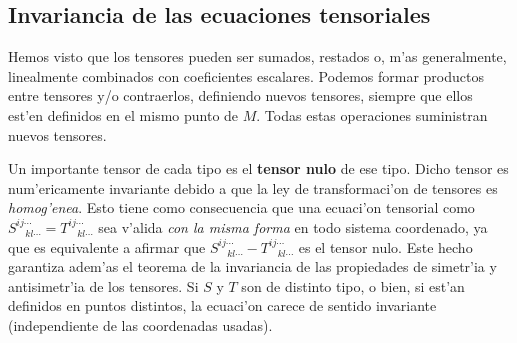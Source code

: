 \subsection{Invariancia de las ecuaciones tensoriales}

Hemos visto que los tensores pueden ser sumados, restados o, m'as
generalmente, linealmente combinados con coeficientes escalares. Podemos
formar productos entre tensores y/o contraerlos, definiendo nuevos tensores, siempre
que  ellos est'en definidos en el mismo punto de $M$. Todas estas operaciones suministran nuevos tensores.

Un importante tensor de cada tipo es el \textbf{tensor
nulo} de ese tipo. Dicho tensor es num'ericamente invariante debido a que la ley de transformaci'on de tensores es \textit{homog'enea}. Esto tiene
como consecuencia que una ecuaci'on tensorial como
$S_{\ \ \ \ kl\cdots }^{ij\cdots }=T_{\ \ \ \ kl\cdots }^{ij\cdots }$ sea
v'alida \textit{con la misma forma} en todo sistema coordenado, ya que es equivalente a afirmar que $S_{\
\ \ \ kl\cdots }^{ij\cdots }-T_{\ \ \ \ kl\cdots }^{ij\cdots }$ es el tensor
nulo.
Este hecho garantiza adem'as el teorema de la invariancia de las propiedades de
simetr'ia y antisimetr'ia de los tensores. Si $S$ y $T$ son de distinto tipo, o
bien, si est'an definidos en puntos distintos, la ecuaci'on carece de sentido
invariante (independiente de las coordenadas usadas).

